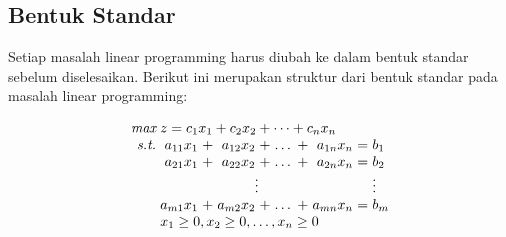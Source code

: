 			

\subsection{Bentuk Standar}
Setiap masalah linear programming harus diubah ke dalam bentuk standar sebelum diselesaikan. Berikut ini merupakan struktur dari bentuk standar pada masalah linear programming:
    	
\begin{equation*}
	\setlength\arraycolsep{1.5pt}
	\begin{array}{r r c r c r c r c l}
	    \textit{max}		& \multicolumn{9}{l}{z = c_1x_1 + c_2x_2 + \dots + c_nx_n} \\
		\textit{s.t.} 	& a_{11}x_1 & + & a_{12}x_2 & + & \dots & + & a_{1n}x_n & = & b_1 \\
    						& a_{21}x_1 & + & a_{22}x_2 & + & \dots & + & a_{2n}x_n & = & b_2 \\
                            & \multicolumn{7}{c}{\vdots}                            &   & \vdots \\
                            & a_{m1}x_1 & + & a_{m2}x_2 & + & \dots & + & a_{mn}x_n & = & b_m \\
                            & \multicolumn{9}{l}{x_1\geq0,x_2\geq0,\dots,x_n\geq0}
	\end{array}
\end{equation*}

